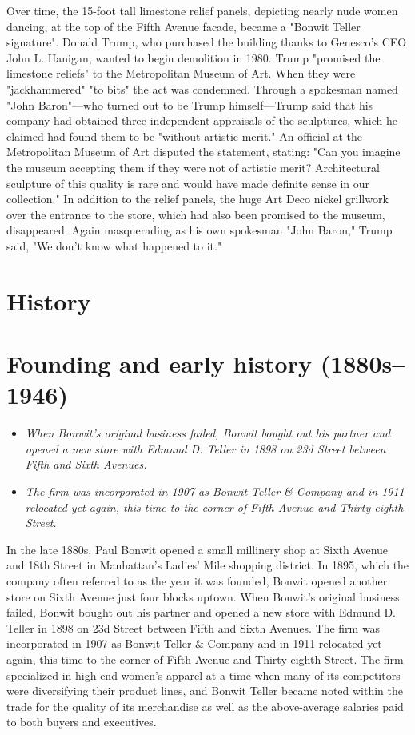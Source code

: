 Over time, the 15-foot tall limestone relief panels, depicting nearly
nude women dancing, at the top of the Fifth Avenue facade, became a
"Bonwit Teller signature". Donald Trump, who purchased the building
thanks to Genesco's CEO John L. Hanigan, wanted to begin demolition in
1980. Trump "promised the limestone reliefs" to the Metropolitan Museum
of Art. When they were "jackhammered" "to bits" the act was condemned.
Through a spokesman named "John Baron"---who turned out to be Trump
himself---Trump said that his company had obtained three independent
appraisals of the sculptures, which he claimed had found them to be
"without artistic merit." An official at the Metropolitan Museum of Art
disputed the statement, stating: "Can you imagine the museum accepting
them if they were not of artistic merit? Architectural sculpture of this
quality is rare and would have made definite sense in our collection."
In addition to the relief panels, the huge Art Deco nickel grillwork
over the entrance to the store, which had also been promised to the
museum, disappeared. Again masquerading as his own spokesman "John
Baron," Trump said, "We don't know what happened to it."

\section{History}\label{history}

\section{Founding and early history
(1880s--1946)}\label{founding-and-early-history-1880s1946}

\begin{itemize}
\item
  \emph{When Bonwit's original business failed, Bonwit bought out his
  partner and opened a new store with Edmund D. Teller in 1898 on 23d
  Street between Fifth and Sixth Avenues.}
\item
  \emph{The firm was incorporated in 1907 as Bonwit Teller \& Company
  and in 1911 relocated yet again, this time to the corner of Fifth
  Avenue and Thirty-eighth Street.}
\end{itemize}

In the late 1880s, Paul Bonwit opened a small millinery shop at Sixth
Avenue and 18th Street in Manhattan's Ladies' Mile shopping district. In
1895, which the company often referred to as the year it was founded,
Bonwit opened another store on Sixth Avenue just four blocks uptown.
When Bonwit's original business failed, Bonwit bought out his partner
and opened a new store with Edmund D. Teller in 1898 on 23d Street
between Fifth and Sixth Avenues. The firm was incorporated in 1907 as
Bonwit Teller \& Company and in 1911 relocated yet again, this time to
the corner of Fifth Avenue and Thirty-eighth Street. The firm
specialized in high-end women's apparel at a time when many of its
competitors were diversifying their product lines, and Bonwit Teller
became noted within the trade for the quality of its merchandise as well
as the above-average salaries paid to both buyers and executives.

